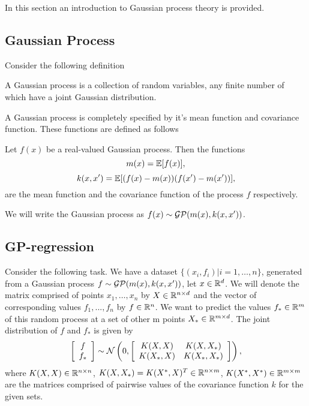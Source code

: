 \documentclass[12pt]{article}
\begin{document}
\hspace{0.6cm}In this section an introduction to Gaussian process theory is provided.

\subsection{Gaussian Process}

	\hspace{0.6cm}Consider the following definition
	\begin{definition}
		A Gaussian process is a collection of random variables, any finite number of which have a joint Gaussian distribution.
	\end{definition}
	A Gaussian process is completely specified by it's mean function and covariance function. These functions are defined as follows
	\begin{definition}
		Let $f(x)$ be a real-valued Gaussian process. Then the functions
		$$m(x) = \mathbb{E}[f(x)],$$
		$$k(x, x') = \mathbb{E}[(f(x) - m(x)) (f(x') - m(x'))],$$
		are the mean function and the covariance function of the process $f$ respectively. 
	\end{definition}
	
	We will write the Gaussian process as $f(x) \sim \mathcal{GP}(m(x), k(x, x'))$.
	
\subsection{GP-regression}
	\hspace{0.6cm}Consider the following task. We have a dataset $\{(x_i, f_i) | i = 1, \ldots, n\}$, generated from a Gaussian process $f \sim \mathcal{GP}(m(x), k(x, x'))$, let $x \in \mathbb{R}^d$.  We will denote the matrix comprised of points $x_1, \ldots, x_n$ by $X \in \mathbb{R}^{n \times d}$ and the vector of corresponding values $f_1, ..., f_n$ by $f \in \mathbb{R}^n$. We want to predict the values $f_* \in \mathbb{R}^m$ of this random process at a set of other m points $X_* \in \mathbb{R}^{m \times d}$. The joint distribution of $f$ and $f_*$ is given by
	$$
	\left [ \begin{array}{c} f\\ f_* \end{array} \right ]
	\sim
	\mathcal{N} \left ( 0, \left [\begin{array}{cc} K(X, X) & K(X, X_*)\\ K(X_*, X) & K(X_*, X_*) \end{array} \right] \right ),
	$$
	where $K(X, X) \in \mathbb{R}^{n \times n}$, $K(X, X_*) = K(X^*, X)^T \in \mathbb{R}^{n \times m}$, $K(X^*, X^*) \in \mathbb{R}^{m \times m}$ are the matrices comprised of pairwise values of the covariance function $k$ for the given sets.
	
\end{document}
